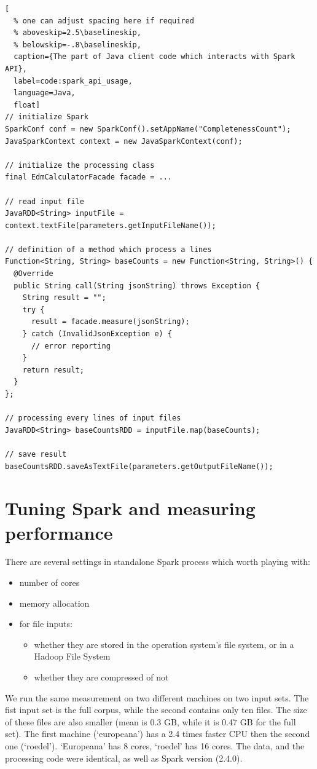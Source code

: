 \begin{lstlisting}[
  % one can adjust spacing here if required
  % aboveskip=2.5\baselineskip,
  % belowskip=-.8\baselineskip,
  caption={The part of Java client code which interacts with Spark API},
  label=code:spark_api_usage,
  language=Java,
  float]
// initialize Spark
SparkConf conf = new SparkConf().setAppName("CompletenessCount");
JavaSparkContext context = new JavaSparkContext(conf);

// initialize the processing class
final EdmCalculatorFacade facade = ... 

// read input file
JavaRDD<String> inputFile = context.textFile(parameters.getInputFileName());

// definition of a method which process a lines
Function<String, String> baseCounts = new Function<String, String>() {
  @Override
  public String call(String jsonString) throws Exception {
    String result = "";
    try {
      result = facade.measure(jsonString);
    } catch (InvalidJsonException e) {
      // error reporting
    }
    return result;
  }
};

// processing every lines of input files
JavaRDD<String> baseCountsRDD = inputFile.map(baseCounts);

// save result
baseCountsRDD.saveAsTextFile(parameters.getOutputFileName());
\end{lstlisting}

\section{Tuning Spark and measuring performance}

There are several settings in standalone Spark process which worth playing with:
\begin{itemize}
 \setlength{\parskip}{0pt}
 \setlength{\itemsep}{0pt plus 1pt}
 \item number of cores
 \item memory allocation
 \item for file inputs:
 \begin{itemize}
  \setlength{\parskip}{0pt}
  \setlength{\itemsep}{0pt plus 1pt}
  \item whether they are stored in the operation system's file system, or in a Hadoop File System
  \item whether they are compressed of not
 \end{itemize}
\end{itemize}

We run the same measurement on two different machines on two input sets. The fist input set is the full corpus, while the second contains only ten files. The size of these files are also smaller (mean is 0.3 GB, while it is 0.47 GB for the full set). The first machine (`europeana') has a 2.4 times faster CPU then the second one (`roedel'). `Europeana' has 8 cores, `roedel' has 16 cores. The data, and the processing code were identical, as well as Spark version (2.4.0).

